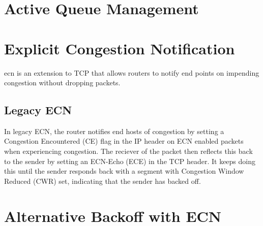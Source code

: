 \section{Active Queue Management}



\section{Explicit Congestion Notification}

\gls{ecn} is an extension to TCP that allows routers to notify end points on impending congestion without dropping packets.

\subsection{Legacy ECN}
In legacy ECN, the router notifies end hosts of congestion by setting a Congestion Encountered (CE) flag in the IP header on ECN enabled packets when experiencing congestion. The reciever of the packet then reflects this back to the sender by setting an ECN-Echo (ECE) in the TCP header. It keeps doing this until the sender responds back with a segment with Congestion Window Reduced (CWR) set, indicating that the sender has backed off.


\section{Alternative Backoff with ECN}

